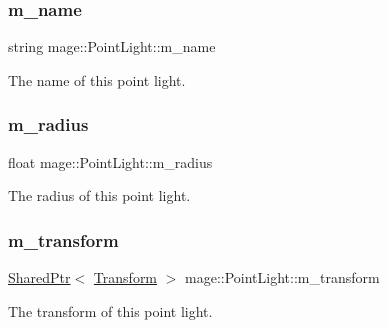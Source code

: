 \subsubsection{\texorpdfstring{m\+\_\+name}{m\_name}}
{\footnotesize\ttfamily string mage\+::\+Point\+Light\+::m\+\_\+name\hspace{0.3cm}{\ttfamily [private]}}

The name of this point light. \hypertarget{classmage_1_1_point_light_a04459adec2eaadc457799e4399b5df1f}{}\label{classmage_1_1_point_light_a04459adec2eaadc457799e4399b5df1f} 
\subsubsection{\texorpdfstring{m\+\_\+radius}{m\_radius}}
{\footnotesize\ttfamily float mage\+::\+Point\+Light\+::m\+\_\+radius\hspace{0.3cm}{\ttfamily [private]}}

The radius of this point light. \hypertarget{classmage_1_1_point_light_a080be38309dd4dba28ac0fc65d99756e}{}\label{classmage_1_1_point_light_a080be38309dd4dba28ac0fc65d99756e} 
\subsubsection{\texorpdfstring{m\+\_\+transform}{m\_transform}}
{\footnotesize\ttfamily \hyperlink{namespacemage_a1e01ae66713838a7a67d30e44c67703e}{Shared\+Ptr}$<$ \hyperlink{structmage_1_1_transform}{Transform} $>$ mage\+::\+Point\+Light\+::m\+\_\+transform\hspace{0.3cm}{\ttfamily [private]}}

The transform of this point light. 